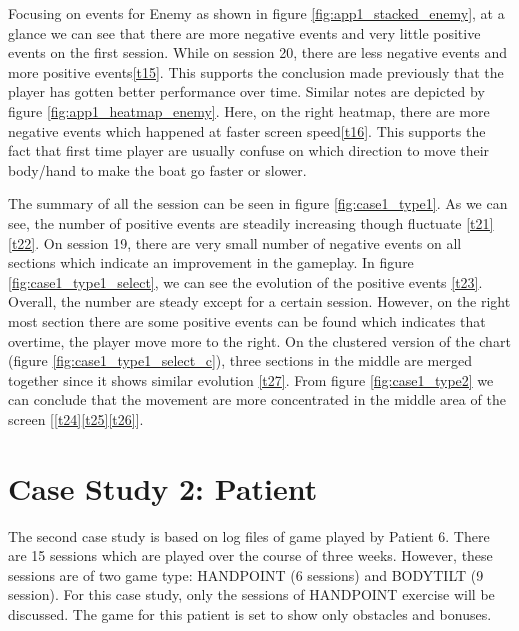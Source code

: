 Focusing on events for Enemy as shown in figure \ref{fig:app1_stacked_enemy}, at a glance we can see that there are more negative events and very little positive events on the first session. While on session 20, there are less negative events and more positive events\ref{t15}. This supports the conclusion made previously that the player has gotten better performance over time. Similar notes are depicted by figure \ref{fig:app1_heatmap_enemy}. Here, on the right heatmap, there are more negative events which happened at faster screen speed\ref{t16}. This supports the fact that first time player are usually confuse on which direction to move their body/hand to make the boat go faster or slower.

The summary of all the session can be seen in figure \ref{fig:case1_type1}. As we can see, the number of positive events are steadily increasing though fluctuate \ref{t21}\ref{t22}. On session 19, there are very small number of negative events on all sections which indicate an improvement in the gameplay. In figure \ref{fig:case1_type1_select}, we can see the evolution of the positive events \ref{t23}. Overall, the number are steady except for a certain session. However, on the right most section there are some positive events can be found which indicates that overtime, the player move more to the right. On the clustered version of the chart (figure \ref{fig:case1_type1_select_c}), three sections in the middle are merged together since it shows similar evolution \ref{t27}. From figure \ref{fig:case1_type2} we can conclude that the movement are more concentrated in the middle area of the screen [\ref{t24}\ref{t25}\ref{t26}].

\section{Case Study 2: Patient}
The second case study is based on log files of game played by Patient 6. There are 15 sessions which are played over the course of three weeks. However, these sessions are of two game type: HANDPOINT (6 sessions) and BODYTILT (9 session). For this case study, only the sessions of HANDPOINT exercise will be discussed. The game for this patient is set to show only obstacles and bonuses.

